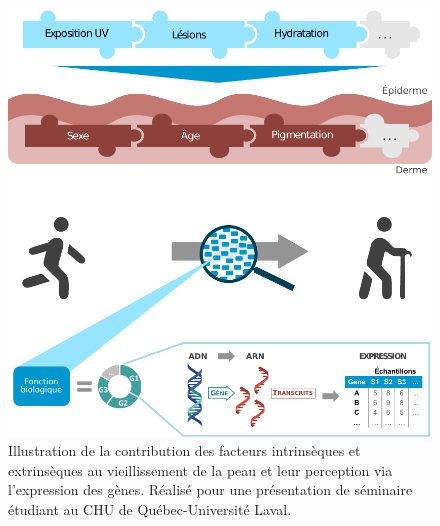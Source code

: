 \begin{figure}
    \centering
    \includegraphics{img/annexe_projets_annexe/20190312_TeaAndLearn_ReuLabo_avancement.pdf}
    \caption{Illustration de la contribution des facteurs intrinsèques et extrinsèques au vieillissement de la peau et leur perception via l'expression des gènes. Réalisé pour une présentation de séminaire étudiant au CHU de Québec-Université Laval.}
    \label{fig:annexe_schema_aging_skin_transcripto}
\end{figure}

